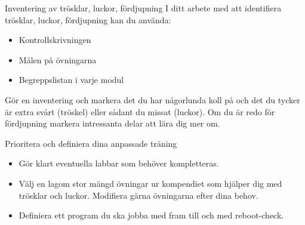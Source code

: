 
\begin{Slide}{Inventering av trösklar, luckor, fördjupning}
I ditt arbete med att identifiera trösklar, luckor, fördjupning kan du använda:
\begin{itemize}
\item Kontrollskrivningen
\item Målen på övningarna
\item Begreppslistan i varje modul
\end{itemize}
Gör en inventering och markera det du har någorlunda koll på och det du tycker är extra svårt (tröskel) eller sådant du missat (luckor). Om du är redo för fördjupning markera intressanta delar att lära dig mer om.
\end{Slide}

\begin{Slide}{Prioritera och definiera dina anpassade träning}
\begin{itemize}
\item Gör klart eventuella labbar som behöver kompletteras.
\item Välj en lagom stor mängd övningar ur kompendiet som hjälper dig med trösklar och luckor. Modifiera gärna övningarna efter dina behov.
\item Definiera ett program du ska jobba med fram till och med reboot-check.
\end{itemize}
\end{Slide}


\fi
